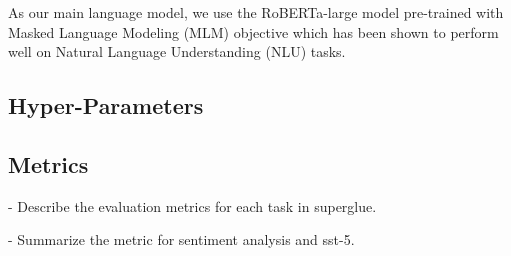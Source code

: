 \documentclass[11pt]{article}
\begin{document}
As our main language model, we use the RoBERTa-large model pre-trained with Masked Language Modeling (MLM) objective \cite{DBLP:journals/corr/abs-1907-11692} which has been shown to perform well on Natural Language Understanding (NLU) tasks.

\subsection{Hyper-Parameters}

\subsection{Metrics}
- Describe the evaluation metrics for each task in superglue.

- Summarize the metric for sentiment analysis and sst-5.
\end{document}
